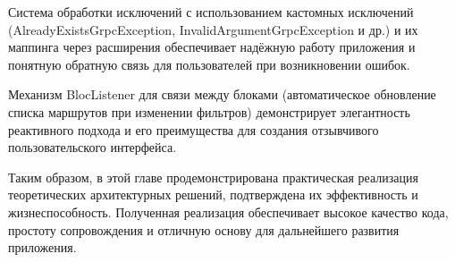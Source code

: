Система обработки исключений с использованием кастомных исключений (AlreadyExistsGrpcException, InvalidArgumentGrpcException и др.) и их маппинга через расширения обеспечивает надёжную работу приложения и понятную обратную связь для пользователей при возникновении ошибок.

Механизм BlocListener для связи между блоками (автоматическое обновление списка маршрутов при изменении фильтров) демонстрирует элегантность реактивного подхода и его преимущества для создания отзывчивого пользовательского интерфейса.

Таким образом, в этой главе продемонстрирована практическая реализация теоретических архитектурных решений, подтверждена их эффективность и жизнеспособность. Полученная реализация обеспечивает высокое качество кода, простоту сопровождения и отличную основу для дальнейшего развития приложения.


